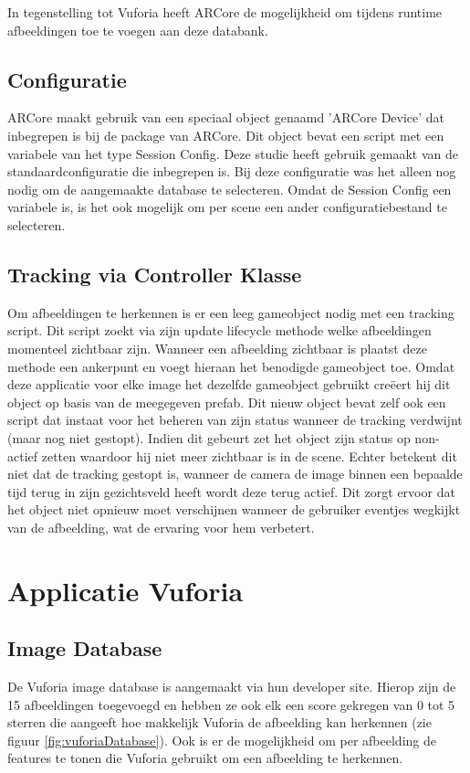 In tegenstelling tot Vuforia heeft ARCore de mogelijkheid om tijdens runtime afbeeldingen toe te voegen aan deze databank.

\subsection{Configuratie}
ARCore maakt gebruik van een speciaal object genaamd 'ARCore Device' dat inbegrepen is bij de package van ARCore. Dit object bevat een script met een variabele van het type Session Config. Deze studie heeft gebruik gemaakt van de standaardconfiguratie die inbegrepen is. Bij deze configuratie was het alleen nog nodig om de aangemaakte database te selecteren.
Omdat de Session Config een variabele is, is het ook mogelijk om per scene een ander configuratiebestand te selecteren.

\subsection{Tracking via Controller Klasse}
Om afbeeldingen te herkennen is er een leeg gameobject nodig met een tracking script. Dit script zoekt via zijn update lifecycle methode welke afbeeldingen momenteel zichtbaar zijn. Wanneer een afbeelding zichtbaar is plaatst deze methode een ankerpunt en voegt hieraan het benodigde gameobject toe. Omdat deze applicatie voor elke image het dezelfde gameobject gebruikt creëert hij dit object op basis van de meegegeven prefab. Dit nieuw object bevat zelf ook een script dat instaat voor het beheren van zijn status wanneer de tracking verdwijnt (maar nog niet gestopt). Indien dit gebeurt zet het object zijn status op non-actief zetten waardoor hij niet meer zichtbaar is in de scene. Echter betekent dit niet dat de tracking gestopt is, wanneer de camera de image binnen een bepaalde tijd terug in zijn gezichtsveld heeft wordt deze terug actief. Dit zorgt ervoor dat het object niet opnieuw moet verschijnen wanneer de gebruiker eventjes wegkijkt van de afbeelding, wat de ervaring voor hem verbetert.

\section{Applicatie Vuforia}

\subsection{Image Database}
De Vuforia image database is aangemaakt via hun developer site. Hierop zijn de 15 afbeeldingen toegevoegd en hebben ze ook elk een score gekregen van 0 tot 5 sterren die aangeeft hoe makkelijk Vuforia de afbeelding kan herkennen (zie figuur \ref{fig:vuforiaDatabase}). Ook is er de mogelijkheid om per afbeelding de features te tonen die Vuforia gebruikt om een afbeelding te herkennen.

